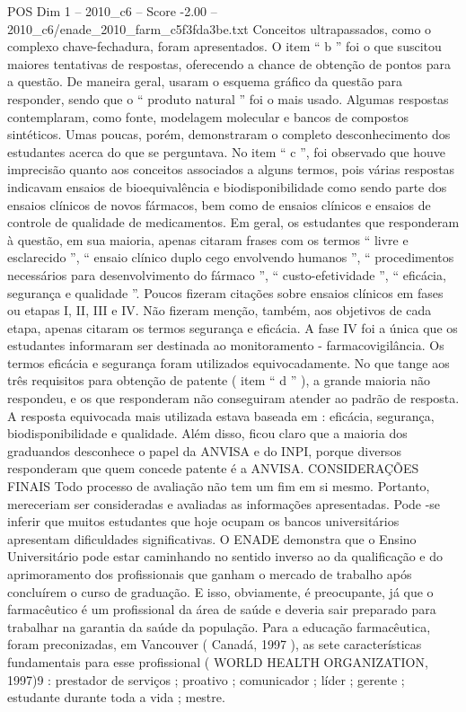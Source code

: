 \begin{textsample}{POS Dim 1 – 2010\_c6 – Score -2.00 – 2010\_c6/enade\_2010\_farm\_c5f3fda3be.txt}
Conceitos ultrapassados, como o complexo chave-fechadura, foram apresentados.
O item “ b ” foi o que suscitou maiores tentativas de respostas, oferecendo a chance de obtenção de pontos para a questão.
De maneira geral, usaram o esquema gráfico da questão para responder, sendo que o “ produto natural ” foi o mais usado.
Algumas respostas contemplaram, como fonte, modelagem molecular e bancos de compostos sintéticos.
Umas poucas, porém, demonstraram o completo desconhecimento dos estudantes acerca do que se perguntava.
No item “ c ”, foi observado que houve imprecisão quanto aos conceitos associados a alguns termos, pois várias respostas indicavam ensaios de bioequivalência e biodisponibilidade como sendo parte dos ensaios clínicos de novos fármacos, bem como de ensaios clínicos e ensaios de controle de qualidade de medicamentos.
Em geral, os estudantes que responderam à questão, em sua maioria, apenas citaram frases com os termos “ livre e esclarecido ”, “ ensaio clínico duplo cego envolvendo humanos ”, “ procedimentos necessários para desenvolvimento do fármaco ”, “ custo-efetividade ”, “ eficácia, segurança e qualidade ”.
Poucos fizeram citações sobre ensaios clínicos em fases ou etapas I, II, III e IV.
Não fizeram menção, também, aos objetivos de cada etapa, apenas citaram os termos segurança e eficácia.
A fase IV foi a única que os estudantes informaram ser destinada ao monitoramento - farmacovigilância.
Os termos eficácia e segurança foram utilizados equivocadamente.
No que tange aos três requisitos para obtenção de patente ( item “ d ” ), a grande maioria não respondeu, e os que responderam não conseguiram atender ao padrão de resposta.
A resposta equivocada mais utilizada estava baseada em : eficácia, segurança, biodisponibilidade e qualidade.
Além disso, ficou claro que a maioria dos graduandos desconhece o papel da ANVISA e do INPI, porque diversos responderam que quem concede patente é a ANVISA.
CONSIDERAÇÕES FINAIS Todo processo de avaliação não tem um fim em si mesmo.
Portanto, mereceriam ser consideradas e avaliadas as informações apresentadas.
Pode -se inferir que muitos estudantes que hoje ocupam os bancos universitários apresentam dificuldades significativas.
O ENADE demonstra que o Ensino Universitário pode estar caminhando no sentido inverso ao da qualificação e do aprimoramento dos profissionais que ganham o mercado de trabalho após concluírem o curso de graduação.
E isso, obviamente, é preocupante, já que o farmacêutico é um profissional da área de saúde e deveria sair preparado para trabalhar na garantia da saúde da população.
Para a educação farmacêutica, foram preconizadas, em Vancouver ( Canadá, 1997 ), as sete características fundamentais para esse profissional ( WORLD HEALTH ORGANIZATION, 1997)9 : prestador de serviços ; proativo ; comunicador ; líder ; gerente ; estudante durante toda a vida ; mestre.

\end{textsample}
